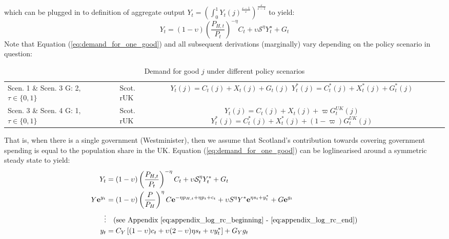 which can be plugged in to definition of aggregate output $Y_t = \left( \int_{0}^{1} Y_t(j)^{\frac{\varepsilon-1}{\varepsilon}}\right)^{\frac{\varepsilon}{\varepsilon-1}}$ to yield:
\begin{equation}
    Y_t = (1-\upsilon) \left(\frac{P_{H,t}}{P_t}\right)^{-\eta}C_t + \upsilon \mathcal{S}^\eta Y^\star_t + G_t
\end{equation}
Note that Equation (\ref{eq:demand_for_one_good}) and all subsequent derivations (marginally) vary depending on the policy scenario in question:
\begin{table}[H]
    \renewcommand{\arraystretch}{2}
    \centering
    \begin{tabular}{l|l|c}
    \makecell{Scen. 1 \& Scen. 3\\ G: 2, $\tau \in \{0, 1\}$} & \makecell{Scot. \\ rUK } & 
        \makecell{
            $Y_t(j) = C_t(j) + X_t(j) + G_t(j)$\\
            $Y^*_t(j) = C^*_t(j) + X^*_t(j) + G^*_t(j)$
        }  \\ 
    \makecell{Scen. 3 \& Scen. 4\\ G: 1, $\tau \in \{0, 1\}$} & \makecell{Scot. \\ rUK } & 
        \makecell{
            $Y_t(j) = C_t(j) + X_t(j) + \varpi G^{UK}_t(j)$\\
            $Y^*_t(j) = C^*_t(j) + X^*_t(j) + (1-\varpi) G^{UK}_t(j)$
        }   
    \end{tabular}
    \vspace{0.5cm}
    \caption{Demand for good $j$ under different policy scenarios}
\end{table}
That is, when there is a single government (Westminister), then we assume that Scotland's contribution towards covering government spending is equal to the population share in the UK. Equation (\ref{eq:demand_for_one_good}) can be loglinearised around a symmetric steady state to yield:
\begin{align}
    Y_t &= (1-\upsilon)\left(\frac{P_{H,t}}{P_t}\right)^{-\eta}C_t + \upsilon \mathcal{S}_t^{\eta}Y_t^* + G_t\\
    Y \mathbf{e}^{y_t} &= (1-\upsilon)\left(\frac{P}{P_{H}}\right)^{\eta}C \mathbf{e}^{-\eta p_{H,t} + \eta p_t + c_t}+ \upsilon S^{\eta} Y^* \mathbf{e}^{\eta s_t + y^*_t} + G \mathbf{e}^{g_t}\\
    \vdots & \quad \text{(see Appendix \ref{eq:appendix_log_rc_beginning} - \ref{eq:appendix_log_rc_end})} \nonumber \\
    y_t &= C_Y\left[(1-\upsilon)c_t + \upsilon (2-\upsilon)\eta s_t + \upsilon y^*_t\right] + G_Y g_t \label{eq:aggregate_rc}
\end{align}
